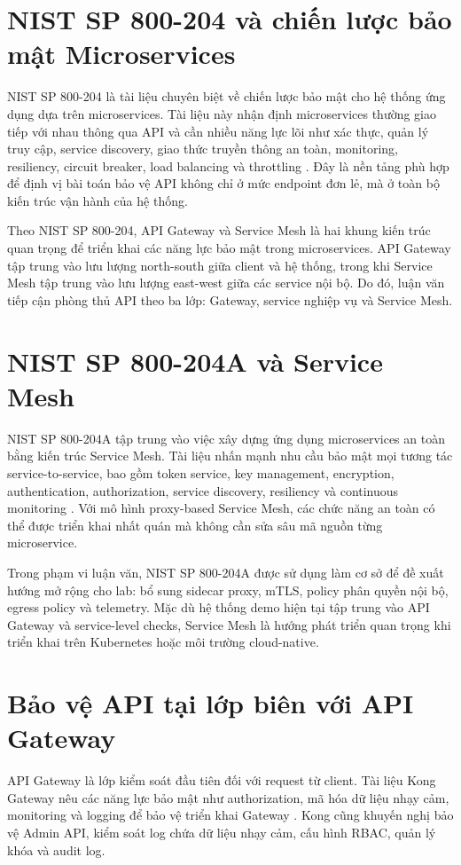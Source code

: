\documentclass[14pt,a4paper]{extreport}
\begin{document}
\section{NIST SP 800-204 và chiến lược bảo mật Microservices}
NIST SP 800-204 là tài liệu chuyên biệt về chiến lược bảo mật cho hệ thống ứng dụng dựa trên microservices. Tài liệu này nhận định microservices thường giao tiếp với nhau thông qua API và cần nhiều năng lực lõi như xác thực, quản lý truy cập, service discovery, giao thức truyền thông an toàn, monitoring, resiliency, circuit breaker, load balancing và throttling \cite{nist204}. Đây là nền tảng phù hợp để định vị bài toán bảo vệ API không chỉ ở mức endpoint đơn lẻ, mà ở toàn bộ kiến trúc vận hành của hệ thống.

Theo NIST SP 800-204, API Gateway và Service Mesh là hai khung kiến trúc quan trọng để triển khai các năng lực bảo mật trong microservices. API Gateway tập trung vào lưu lượng north-south giữa client và hệ thống, trong khi Service Mesh tập trung vào lưu lượng east-west giữa các service nội bộ. Do đó, luận văn tiếp cận phòng thủ API theo ba lớp: Gateway, service nghiệp vụ và Service Mesh.

\section{NIST SP 800-204A và Service Mesh}
NIST SP 800-204A tập trung vào việc xây dựng ứng dụng microservices an toàn bằng kiến trúc Service Mesh. Tài liệu nhấn mạnh nhu cầu bảo mật mọi tương tác service-to-service, bao gồm token service, key management, encryption, authentication, authorization, service discovery, resiliency và continuous monitoring \cite{nist204a}. Với mô hình proxy-based Service Mesh, các chức năng an toàn có thể được triển khai nhất quán mà không cần sửa sâu mã nguồn từng microservice.

Trong phạm vi luận văn, NIST SP 800-204A được sử dụng làm cơ sở để đề xuất hướng mở rộng cho lab: bổ sung sidecar proxy, mTLS, policy phân quyền nội bộ, egress policy và telemetry. Mặc dù hệ thống demo hiện tại tập trung vào API Gateway và service-level checks, Service Mesh là hướng phát triển quan trọng khi triển khai trên Kubernetes hoặc môi trường cloud-native.

\section{Bảo vệ API tại lớp biên với API Gateway}
API Gateway là lớp kiểm soát đầu tiên đối với request từ client. Tài liệu Kong Gateway nêu các năng lực bảo mật như authorization, mã hóa dữ liệu nhạy cảm, monitoring và logging để bảo vệ triển khai Gateway \cite{kongsecurity}. Kong cũng khuyến nghị bảo vệ Admin API, kiểm soát log chứa dữ liệu nhạy cảm, cấu hình RBAC, quản lý khóa và audit log.
\end{document}
